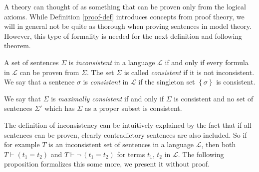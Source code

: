 \documentclass[../../main.tex]{subfiles}
\begin{document}
A theory can thought of as something that can be proven only from the logical axioms.
While Definition \ref{proof-def} introduces concepts from proof theory, we will in general not be quite as thorough when proving sentences in model theory.
However, this type of formality is needed for the next definition and following theorem.

\begin{definition}[Consistency]\cite[p.25]{Cha90}
    A set of sentences $\Sigma$ is \emph{inconsistent} in a language $\mathcal{L}$ if and only if every formula in $\mathcal{L}$ can be proven from $\Sigma$.
    The set $\Sigma$ is called \emph{consistent} if it is not inconsistent.
    We say that a sentence $\sigma$ is \emph{consistent} in $\mathcal{L}$ if the singleton set $\left\{\sigma\right\}$ is consistent.

    We say that $\Sigma$ is \emph{maximally consistent} if and only if $\Sigma$ is consistent 
    and no set of sentences $\Sigma'$ which has $\Sigma$ as a proper subset is consistent.
\end{definition}  

The definition of inconsistency can be intuitively explained by the fact that if all sentences can be proven, clearly contradictory sentences are also included.
So if for example $T$ is an inconsistent set of sentences in a language $\mathcal{L}$, then both $T \vdash (t_1 = t_2)$ and $T \vdash \lnot\,(t_1 = t_2)$ for terms $t_1,\, t_2$ in $\mathcal{L}$.
The following proposition formalizes this some more, we present it without proof.
\end{document}
